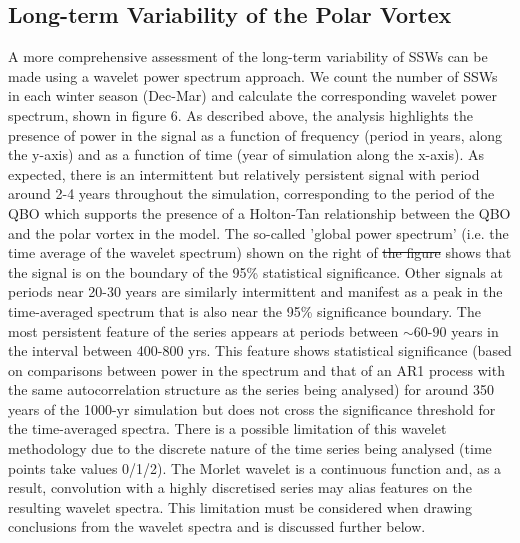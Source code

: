 \documentclass[wcd, manuscript]{copernicus}
\providecommand{\DIFadd}[1]{{\protect\color{blue}\uwave{#1}}} %
\providecommand{\DIFdel}[1]{{\protect\color{red}\sout{#1}}}                      %
\providecommand{\DIFaddbegin}{} %
\providecommand{\DIFaddend}{} %
\providecommand{\DIFdelbegin}{} %
\providecommand{\DIFdelend}{} %
\begin{document}

\subsection{Long-term Variability of the Polar Vortex}
A more comprehensive assessment of the long-term variability of SSWs can be made using a wavelet power spectrum approach. We count the number of SSWs in each winter season (Dec-Mar) and calculate the corresponding wavelet power spectrum, shown in figure 6. As described above, the analysis highlights the presence of power in the signal as a function of frequency (period in years, along the y-axis) and as a function of time (year of simulation along the x-axis). As expected, there is an intermittent but relatively persistent signal with period around 2-4 years throughout the simulation, corresponding to the period of the QBO which supports the presence of a Holton-Tan relationship between the QBO and the polar vortex in the model. The so-called 'global power spectrum' (i.e. the time average of the wavelet spectrum) shown on the right of \DIFdelbegin \DIFdel{the figure }\DIFdelend \DIFaddbegin \DIFadd{figure 6 }\DIFaddend shows that the signal is on the boundary of the 95\% statistical significance. Other signals at periods near 20-30 years are similarly intermittent and manifest as a peak in the time-averaged spectrum that is also near the 95\% significance boundary. The most persistent feature of the series appears at periods between $\sim$60-90 years in the interval between 400-800 yrs. This feature shows statistical significance (based on comparisons between power in the spectrum and that of an AR1 process with the same autocorrelation structure as the series being analysed) for around 350 years of the 1000-yr simulation but does not cross the significance threshold for the time-averaged spectra. There is a possible limitation of this wavelet methodology due to the discrete nature of the time series being analysed (time points take values 0/1/2). The Morlet wavelet is a continuous function and, as a result, convolution with a highly discretised series may alias features on the resulting wavelet spectra. This limitation must be considered when drawing conclusions from the wavelet spectra and is discussed further below.
\end{document}
